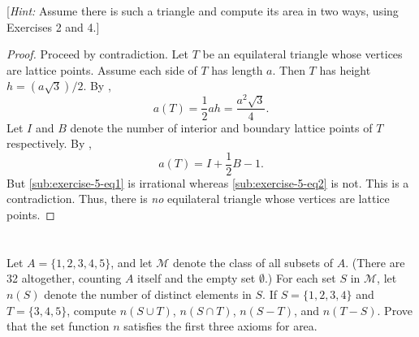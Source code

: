 \documentclass{article}
\begin{document}
[\textit{Hint:} Assume there is such a triangle and compute its area in two
ways, using Exercises 2 and 4.]

\begin{proof}

  Proceed by contradiction.
  Let $T$ be an equilateral triangle whose vertices are lattice points.
  Assume each side of $T$ has length $a$.
  Then $T$ has height $h = (a\sqrt{3}) / 2$.
  By ,
    \begin{equation}
      \label{sub:exercise-5-eq1}
      \tag{5.1}
      a(T) = \frac{1}{2}ah = \frac{a^2\sqrt{3}}{4}.
    \end{equation}
  Let $I$ and $B$ denote the number of interior and boundary lattice points of
    $T$ respectively.
  By ,
    \begin{equation}
      \label{sub:exercise-5-eq2}
      \tag{5.2}
      a(T) = I + \frac{1}{2}B - 1.
    \end{equation}
  But \eqref{sub:exercise-5-eq1} is irrational whereas
    \eqref{sub:exercise-5-eq2} is not.
  This is a contradiction.
  Thus, there is \textit{no} equilateral triangle whose vertices are lattice
    points.

\end{proof}

\section*{}%
%

Let $A = \{1, 2, 3, 4, 5\}$, and let $\mathscr{M}$ denote the class of all
  subsets of $A$.
(There are 32 altogether, counting $A$ itself and the empty set $\emptyset$.)
For each set $S$ in $\mathscr{M}$, let $n(S)$ denote the number of distinct
  elements in $S$.
If $S = \{1, 2, 3, 4\}$ and $T = \{3, 4, 5\}$, compute $n(S \cup T)$,
  $n(S \cap T)$, $n(S - T)$, and $n(T - S)$.
Prove that the set function $n$ satisfies the first three axioms for area.
\end{document}
